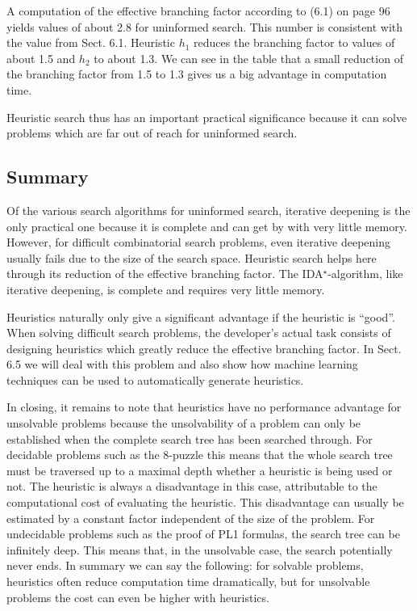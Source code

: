 \documentclass[10pt]{book}
\begin{document}
A computation of the effective branching factor according to (6.1) on page 96 yields values of about 2.8 for uninformed search. This number is consistent with the value from Sect. 6.1. Heuristic $h_{1}$ reduces the branching factor to values of about 1.5 and $h_{2}$ to about 1.3. We can see in the table that a small reduction of the branching factor from 1.5 to 1.3 gives us a big advantage in computation time.

Heuristic search thus has an important practical significance because it can solve problems which are far out of reach for uninformed search.

\subsection{Summary}
Of the various search algorithms for uninformed search, iterative deepening is the only practical one because it is complete and can get by with very little memory. However, for difficult combinatorial search problems, even iterative deepening usually fails due to the size of the search space. Heuristic search helps here through its reduction of the effective branching factor. The IDA$^{\star}$-algorithm, like iterative deepening, is complete and requires very little memory.

Heuristics naturally only give a significant advantage if the heuristic is ``good''. When solving difficult search problems, the developer's actual task consists of designing heuristics which greatly reduce the effective branching factor. In Sect. 6.5 we will deal with this problem and also show how machine learning techniques can be used to automatically generate heuristics.

In closing, it remains to note that heuristics have no performance advantage for unsolvable problems because the unsolvability of a problem can only be established when the complete search tree has been searched through. For decidable problems such as the 8-puzzle this means that the whole search tree must be traversed up to a maximal depth whether a heuristic is being used or not. The heuristic is always a disadvantage in this case, attributable to the computational cost of evaluating the heuristic. This disadvantage can usually be estimated by a constant factor independent of the size of the problem. For undecidable problems such as the proof of PL1 formulas, the search tree can be infinitely deep. This means that, in the unsolvable case, the search potentially never ends. In summary we can say the following: for solvable problems, heuristics often reduce computation time dramatically, but for unsolvable problems the cost can even be higher with heuristics.
\end{document}

